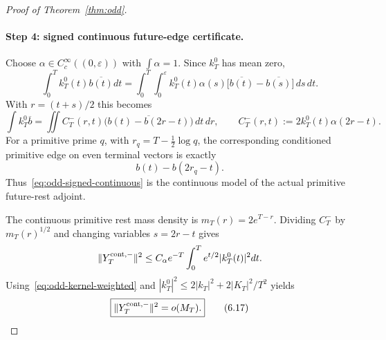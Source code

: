 \begin{proof}[Proof of Theorem~\ref{thm:odd}]
\paragraph{Step 4: signed continuous future-edge certificate.}
Choose
$\alpha\in C_c^\infty((0,\varepsilon))$ with $\int\alpha=1$.
Since $k_T^0$ has mean zero,
\[
 \int_0^Tk_T^0(t)\overline{b(t)}dt
 =\int_0^T\int_0^\varepsilon
 k_T^0(t)\alpha(s)
 \bigl[\overline{b(t)}-\overline{b(s)}\bigr]\,ds\,dt.
\tag{6.15}\label{eq:odd-anchor-identity}
\]
With $r=(t+s)/2$ this becomes
\[
 \int k_T^0\overline b
 =\iint C_T^-(r,t)
 \overline{\bigl(b(t)-b(2r-t)\bigr)}\,dt\,dr,
 \qquad
 C_T^-(r,t):=2k_T^0(t)\alpha(2r-t).
\tag{6.16}\label{eq:odd-signed-continuous}
\]
For a primitive prime $q$, with $r_q=T-\frac12\log q$, the corresponding conditioned
primitive edge on even terminal vectors is exactly
\[
 b(t)-b(2r_q-t).
\]
Thus~\eqref{eq:odd-signed-continuous} is the continuous model of the actual primitive
future-rest adjoint.

The continuous primitive rest mass density is
$m_T(r)=2e^{T-r}$.  Dividing $C_T^-$ by $m_T(r)^{1/2}$ and changing variables
$s=2r-t$ gives
\[
 \|Y_T^{\rm cont,-}\|^2
 \le C_\alpha e^{-T}\int_0^Te^{t/2}|k_T^0(t)|^2dt.
\]
Using~\eqref{eq:odd-kernel-weighted} and
$|k_T^0|^2\le2|k_T|^2+2|K_T|^2/T^2$ yields
\[
 \boxed{\|Y_T^{\rm cont,-}\|^2=o(M_T).}
\tag{6.17}\label{eq:odd-cont-cost}
\]


\end{proof}
